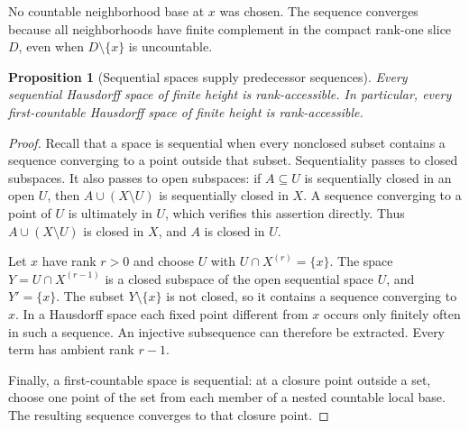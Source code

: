 \documentclass[11pt,letterpaper]{article}
\numberwithin{equation}{section}
\newtheorem{proposition}[proposition]{Proposition}
\theoremstyle{definition}
\theoremstyle{remark}
\theoremstyle{definition}
\begin{document}
No countable neighborhood base at $x$ was chosen. The sequence converges because
all neighborhoods have finite complement in the compact rank-one slice $D$,
even when $D\setminus\{x\}$ is uncountable.

\begin{proposition}[Sequential spaces supply predecessor sequences]
\label{uw:prop:sequential}
Every sequential Hausdorff space of finite height is rank-accessible.
In particular, every first-countable Hausdorff space of finite height is
rank-accessible.
\end{proposition}
\begin{proof}
Recall that a space is sequential when every nonclosed subset contains a
sequence converging to a point outside that subset. Sequentiality passes to
closed subspaces. It also passes to open subspaces: if $A\subseteq U$ is
sequentially closed in an open $U$, then $A\cup(X\setminus U)$ is
sequentially closed in $X$. A sequence converging to a point of $U$ is
ultimately in $U$, which verifies this assertion directly. Thus
$A\cup(X\setminus U)$ is closed in $X$, and $A$ is closed in $U$.

Let $x$ have rank $r>0$ and choose $U$ with
$U\cap X^{(r)}=\{x\}$. The space $Y=U\cap X^{(r-1)}$ is a closed subspace
of the open sequential space $U$, and $Y'=\{x\}$. The subset
$Y\setminus\{x\}$ is not closed, so it contains a sequence converging to
$x$. In a Hausdorff space each fixed point different from $x$ occurs only
finitely often in such a sequence. An injective subsequence can therefore be
extracted. Every term has ambient rank $r-1$.

Finally, a first-countable space is sequential: at a closure point outside a
set, choose one point of the set from each member of a nested countable local
base. The resulting sequence converges to that closure point.
\end{proof}
\end{document}
